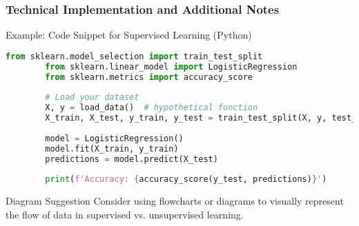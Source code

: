 \documentclass{beamer}
\begin{document}
\begin{frame}[fragile]
    \frametitle{Technical Implementation and Additional Notes}
    \begin{block}{Example: Code Snippet for Supervised Learning (Python)}
        \begin{lstlisting}[language=Python]
        from sklearn.model_selection import train_test_split
        from sklearn.linear_model import LogisticRegression
        from sklearn.metrics import accuracy_score
        
        # Load your dataset
        X, y = load_data()  # hypothetical function
        X_train, X_test, y_train, y_test = train_test_split(X, y, test_size=0.2)
        
        model = LogisticRegression()
        model.fit(X_train, y_train)
        predictions = model.predict(X_test)
        
        print(f'Accuracy: {accuracy_score(y_test, predictions)}')
        \end{lstlisting}
    \end{block}

    \begin{block}{Diagram Suggestion}
        Consider using flowcharts or diagrams to visually represent the flow of data in supervised vs. unsupervised learning.
    \end{block}
\end{frame}
\end{document}
